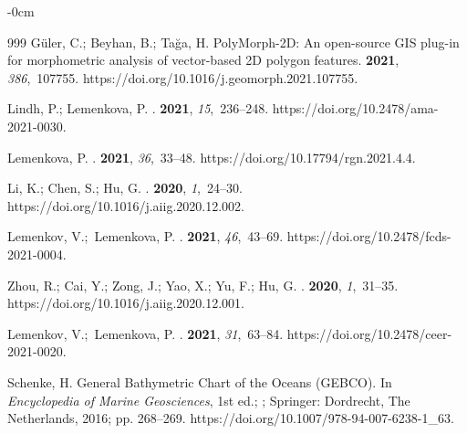 \documentclass[data,article,accept,pdftex,moreauthors]{Definitions/mdpi}
\begin{document}
{\begin{adjustwidth}{-\extralength}{0cm}
\begin{thebibliography}{999}
Güler, C.; Beyhan, B.; Tağa, H.
\newblock PolyMorph-2D: An open-source GIS plug-in for morphometric analysis of
 vector-based 2D polygon features.
 {\bf 2021}, {\em 386},~107755.
https://doi.org/10.1016/j.geomorph.2021.107755.

Lindh, P.; Lemenkova, P.
.
 {\bf 2021}, {\em 15},~236--248.
https://doi.org/10.2478/ama-2021-0030.

Lemenkova, P.
.
 {\bf 2021}, {\em 36},~33--48.
https://doi.org/10.17794/rgn.2021.4.4.

Li, K.; Chen, S.; Hu, G.
.
 {\bf 2020}, {\em
 1},~24--30.
https://doi.org/10.1016/j.aiig.2020.12.002.

Lemenkov, V.;~Lemenkova, P.
.
 {\bf 2021}, {\em
 46},~43--69.
https://doi.org/10.2478/fcds-2021-0004.

Zhou, R.; Cai, Y.; Zong, J.; Yao, X.; Yu, F.; Hu, G.
.
 {\bf 2020}, {\em
 1},~31--35.
https://doi.org/10.1016/j.aiig.2020.12.001.

Lemenkov, V.;~Lemenkova, P.
.
 {\bf 2021}, {\em
 31},~63--84.
https://doi.org/10.2478/ceer-2021-0020.

Schenke, H. {General Bathymetric Chart of the Oceans (GEBCO)}.
\newblock In {\em {Encyclopedia of Marine Geosciences}}, 1st ed.; %
; Springer: Dordrecht, The Netherlands, 2016; pp. 268--269.
https://doi.org/10.1007/978-94-007-6238-1\_63.


\end{thebibliography}
\end{adjustwidth}}
\end{document}
